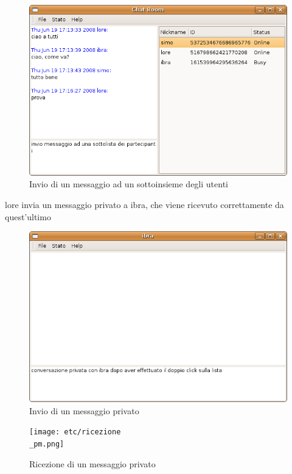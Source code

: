 \begin{figure}[H]
\begin{center}
\includegraphics[scale=0.5]{etc/invio_sottolista.png}
\caption{Invio di un messaggio ad un sottoinsieme degli utenti}
\label{invio\_sottolista}
\end{center}
\end{figure}
lore invia un messaggio privato a ibra, che viene ricevuto correttamente da quest'ultimo
\begin{figure}[H]
\begin{center}
\includegraphics[scale=0.5]{etc/pm_ibra.png}
\caption{Invio di un messaggio privato}
\label{pm\_ibra}
\end{center}
\end{figure}
\begin{figure}[H]
\begin{center}
\texttt{[image: etc/ricezione\\\_pm.png]}
\caption{Ricezione di un messaggio privato}
\label{ricezione\_pm}
\end{center}
\end{figure}
